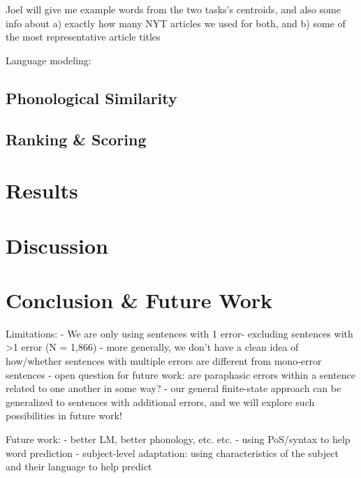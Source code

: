 \documentclass[11pt,letterpaper]{article}
\begin{document}
Joel will give me example words from the two tasks's centroids, and also some info about a) exactly how many NYT articles we used for both, and b) some of the most representative article titles






Language modeling: \cite{RoarkOpenGRM}


\subsection{Phonological Similarity} %
\label{sub:phonological_similarity}


\subsection{Ranking \& Scoring} %
\label{sub:ranking_scoring}


\section{Results}

\section{Discussion}

\section{Conclusion \& Future Work}

Limitations:
    - We are only using sentences with 1 error- excluding sentences with >1 error (N = 1,866)
    - more generally, we don't have a clean idea of how/whether sentences with multiple errors are different from mono-error sentences
        - open question for future work: are paraphasic errors within a sentence related to one another in some way?
        - our general finite-state approach can be generalized to sentences with additional errors, and we will explore such possibilities in future work!

Future work:
    - better LM, better phonology, etc. etc.
    - using PoS/syntax to help word prediction
    - subject-level adaptation: using characteristics of the subject and their language to help predict

%



\end{document}
